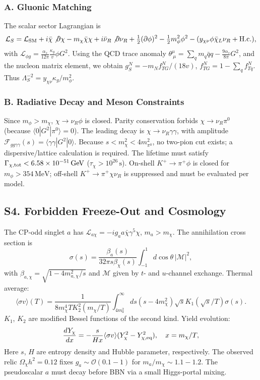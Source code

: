 \documentclass[aps,twocolumn,superscriptaddress,groupedaddress,nofootinbib,floatfix]{revtex4}
\newcommand{\MeV}{\,\mathrm{MeV}}
\newcommand{\GeV}{\,\mathrm{GeV}}
\newcommand{\s}{\,\mathrm{s}}
\begin{document}
\subsubsection*{A. Gluonic Matching}
The scalar sector Lagrangian is
\begin{equation}
\mathcal{L}_S=\mathcal{L}_{\rm SM}+i\bar{\chi}\not\partial\chi-m_\chi\bar{\chi}\chi+i\bar{\nu}_R\not\partial\nu_R+\tfrac12(\partial\phi)^2-\tfrac12m_\phi^2\phi^2-(y_{\chi\nu}\phi\bar{\chi}_L\nu_R+\mathrm{H.c.}),
\end{equation}
with $\mathcal{L}_{\phi g}=\frac{\alpha_s}{12\pi}\frac{\kappa_g}{v}\phi G^2$. Using the QCD trace anomaly $\theta^\mu_{\ \mu}=\sum_q m_q\bar qq-\frac{9\alpha_s}{8\pi}G^2$, and the nucleon matrix element, we obtain $g_S^N=-m_N f_{TG}^N/(18v)$, $f_{TG}^N=1-\sum_q f_{Tq}^N$. Thus $\Lambda_S^{-2}=y_{\chi\nu}\kappa_g/m_\phi^2$. 

\subsubsection*{B. Radiative Decay and Meson Constraints}
Since $m_\phi>m_\chi$, $\chi\to\nu_R\phi$ is closed. Parity conservation forbids $\chi\to\nu_R\pi^0$ (because $\langle0|G^2|\pi^0\rangle=0$). The leading decay is $\chi\to\nu_R\gamma\gamma$, with amplitude $\mathcal F_{gg\gamma\gamma}(s)=\langle\gamma\gamma|G^2|0\rangle$. Because $s<m_\chi^2<4m_{\pi^0}^2$, no two-pion cut exists; a dispersive/lattice calculation is required. The lifetime must satisfy $\Gamma_{\chi,\rm tot}<6.58\times10^{-51}\GeV$ ($\tau_\chi>10^{26}\s$). On-shell $K^+\to\pi^+\phi$ is closed for $m_\phi>354\MeV$; off-shell $K^+\to\pi^+\chi\nu_R$ is suppressed and must be evaluated per model.

\subsection*{S4. Forbidden Freeze-Out and Cosmology}

The CP-odd singlet $a$ has $\mathcal{L}_{a\chi}=-ig_a a\bar\chi\gamma^5\chi$, $m_a>m_\chi$. The annihilation cross section is
\begin{equation}
\sigma(s)=\frac{\beta_a(s)}{32\pi s\beta_\chi(s)}\int_{-1}^{1}d\cos\theta\,|\mathcal M|^2,
\end{equation}
with $\beta_{a,\chi}=\sqrt{1-4m^2_{a,\chi}/s}$ and $\mathcal M$ given by $t$- and $u$-channel exchange. Thermal average:
\begin{equation}
\langle\sigma v\rangle(T)=\frac{1}{8m_\chi^4TK_2^2(m_\chi/T)}\int_{4m_a^2}^{\infty}ds(s-4m_\chi^2)\sqrt{s}K_1(\sqrt{s}/T)\sigma(s).
\end{equation} 
$K_1$, $K_2$ are modified Bessel functions of the second kind. 
Yield evolution:
\begin{equation}
\frac{dY_\chi}{dx}=-\frac{s}{Hx}\langle\sigma v\rangle(Y_\chi^2-Y_{\chi,\rm eq}^2),\quad x=m_\chi/T, 
\end{equation}
Here $s$, $H$ are entropy density and Hubble parameter, respectively. The observed relic $\Omega_\chi h^2=0.12$ fixes $g_a\sim\mathcal O(0.1-1)$ for $m_a/m_\chi\sim1.1-1.2$. The pseudoscalar $a$ must decay before BBN via a small Higgs-portal mixing.
\end{document}
